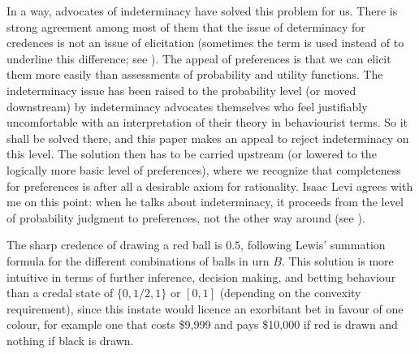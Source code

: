 \documentclass[11pt]{article}
\begin{document}
In a way, advocates of indeterminacy have solved this problem for us.
There is strong agreement among most of them that the issue of
determinacy for credences is not an issue of elicitation (sometimes
the term  is used instead of 
to underline this difference; see ). The appeal
of preferences is that we can elicit them more easily than assessments
of probability and utility functions. The indeterminacy issue has been
raised to the probability level (or moved downstream) by indeterminacy
advocates themselves who feel justifiably uncomfortable with an
interpretation of their theory in behaviourist terms. So it shall be
solved there, and this paper makes an appeal to reject indeterminacy
on this level. The solution then has to be carried upstream (or
lowered to the logically more basic level of preferences), where we
recognize that completeness for preferences is after all a desirable
axiom for rationality. Isaac Levi agrees with me on this point: when
he talks about indeterminacy, it proceeds from the level of
probability judgment to preferences, not the other way around (see
).


The sharp credence of drawing a red ball is $0.5$, following Lewis'
summation formula for the different combinations of balls in urn $B$.
This solution is more intuitive in terms of further inference,
decision making, and betting behaviour than a credal state of
$\{0,1/2,1\}$ or $[0,1]$ (depending on the convexity requirement),
since this instate would licence an exorbitant bet in favour of one
colour, for example one that costs \$9,999 and pays \$10,000 if red is
drawn and nothing if black is drawn.

\end{document}
